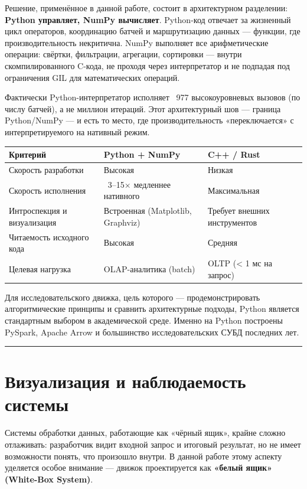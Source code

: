 \documentclass[a4paper,12pt]{report}
\begin{document}
{Решение, применённое в данной работе, состоит в архитектурном разделении: \textbf{Python управляет, NumPy вычисляет}. Python-код отвечает за жизненный цикл операторов, координацию батчей и маршрутизацию данных — функции, где производительность некритична. NumPy выполняет все арифметические операции: свёртки, фильтрации, агрегации, сортировки — внутри скомпилированного C-кода, не проходя через интерпретатор и не подпадая под ограничения GIL для математических операций.

Фактически Python-интерпретатор исполняет ~977 высокоуровневых вызовов (по числу батчей), а не миллион итераций. Этот архитектурный шов — граница Python/NumPy — и есть то место, где производительность «переключается» с интерпретируемого на нативный режим.

\begin{longtable}{|l|l|l|}
\hline
Критерий & Python + NumPy & C++ / Rust \\ \hline
Скорость разработки & Высокая & Низкая \\ \hline
Скорость исполнения & ~3–15× медленнее нативного & Максимальная \\ \hline
Интроспекция и визуализация & Встроенная (Matplotlib, Graphviz) & Требует внешних инструментов \\ \hline
Читаемость исходного кода & Высокая & Средняя \\ \hline
Целевая нагрузка & OLAP-аналитика (batch) & OLTP (< 1 мс на запрос) \\ \hline
\end{longtable}

Для исследовательского движка, цель которого — продемонстрировать алгоритмические принципы и сравнить архитектурные подходы, Python является стандартным выбором в академической среде. Именно на Python построены PySpark, Apache Arrow и большинство исследовательских СУБД последних лет.

\vspace{0.5cm}\hrule\vspace{0.5cm}

\section{Визуализация и наблюдаемость системы}

Системы обработки данных, работающие как «чёрный ящик», крайне сложно отлаживать: разработчик видит входной запрос и итоговый результат, но не имеет возможности понять, что произошло внутри. В данной работе этому аспекту уделяется особое внимание — движок проектируется как \textbf{«белый ящик» (White-Box System)}.

}
\end{document}
